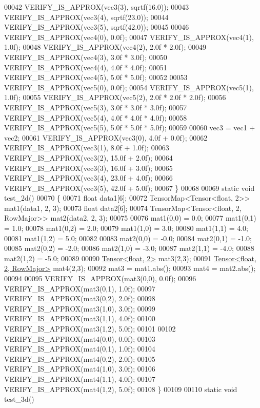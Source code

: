 \begin{DoxyCode}
00042   VERIFY\_IS\_APPROX(vec3(3), sqrtf(16.0));
00043   VERIFY\_IS\_APPROX(vec3(4), sqrtf(23.0));
00044   VERIFY\_IS\_APPROX(vec3(5), sqrtf(42.0));
00045 
00046   VERIFY\_IS\_APPROX(vec4(0), 0.0f);
00047   VERIFY\_IS\_APPROX(vec4(1), 1.0f);
00048   VERIFY\_IS\_APPROX(vec4(2), 2.0f * 2.0f);
00049   VERIFY\_IS\_APPROX(vec4(3), 3.0f * 3.0f);
00050   VERIFY\_IS\_APPROX(vec4(4), 4.0f * 4.0f);
00051   VERIFY\_IS\_APPROX(vec4(5), 5.0f * 5.0f);
00052 
00053   VERIFY\_IS\_APPROX(vec5(0), 0.0f);
00054   VERIFY\_IS\_APPROX(vec5(1), 1.0f);
00055   VERIFY\_IS\_APPROX(vec5(2), 2.0f * 2.0f * 2.0f);
00056   VERIFY\_IS\_APPROX(vec5(3), 3.0f * 3.0f * 3.0f);
00057   VERIFY\_IS\_APPROX(vec5(4), 4.0f * 4.0f * 4.0f);
00058   VERIFY\_IS\_APPROX(vec5(5), 5.0f * 5.0f * 5.0f);
00059 
00060   vec3 = vec1 + vec2;
00061   VERIFY\_IS\_APPROX(vec3(0), 4.0f + 0.0f);
00062   VERIFY\_IS\_APPROX(vec3(1), 8.0f + 1.0f);
00063   VERIFY\_IS\_APPROX(vec3(2), 15.0f + 2.0f);
00064   VERIFY\_IS\_APPROX(vec3(3), 16.0f + 3.0f);
00065   VERIFY\_IS\_APPROX(vec3(4), 23.0f + 4.0f);
00066   VERIFY\_IS\_APPROX(vec3(5), 42.0f + 5.0f);
00067 \}
00068 
00069 \textcolor{keyword}{static} \textcolor{keywordtype}{void} test\_2d()
00070 \{
00071   \textcolor{keywordtype}{float} data1[6];
00072   TensorMap<Tensor<float, 2>> mat1(data1, 2, 3);
00073   \textcolor{keywordtype}{float} data2[6];
00074   TensorMap<Tensor<float, 2, RowMajor>> mat2(data2, 2, 3);
00075 
00076   mat1(0,0) = 0.0;
00077   mat1(0,1) = 1.0;
00078   mat1(0,2) = 2.0;
00079   mat1(1,0) = 3.0;
00080   mat1(1,1) = 4.0;
00081   mat1(1,2) = 5.0;
00082 
00083   mat2(0,0) = -0.0;
00084   mat2(0,1) = -1.0;
00085   mat2(0,2) = -2.0;
00086   mat2(1,0) = -3.0;
00087   mat2(1,1) = -4.0;
00088   mat2(1,2) = -5.0;
00089 
00090   \hyperlink{class_eigen_1_1_tensor}{Tensor<float, 2>} mat3(2,3);
00091   \hyperlink{class_eigen_1_1_tensor}{Tensor<float, 2, RowMajor>} mat4(2,3);
00092   mat3 = mat1.abs();
00093   mat4 = mat2.abs();
00094 
00095   VERIFY\_IS\_APPROX(mat3(0,0), 0.0f);
00096   VERIFY\_IS\_APPROX(mat3(0,1), 1.0f);
00097   VERIFY\_IS\_APPROX(mat3(0,2), 2.0f);
00098   VERIFY\_IS\_APPROX(mat3(1,0), 3.0f);
00099   VERIFY\_IS\_APPROX(mat3(1,1), 4.0f);
00100   VERIFY\_IS\_APPROX(mat3(1,2), 5.0f);
00101 
00102   VERIFY\_IS\_APPROX(mat4(0,0), 0.0f);
00103   VERIFY\_IS\_APPROX(mat4(0,1), 1.0f);
00104   VERIFY\_IS\_APPROX(mat4(0,2), 2.0f);
00105   VERIFY\_IS\_APPROX(mat4(1,0), 3.0f);
00106   VERIFY\_IS\_APPROX(mat4(1,1), 4.0f);
00107   VERIFY\_IS\_APPROX(mat4(1,2), 5.0f);
00108 \}
00109 
00110 \textcolor{keyword}{static} \textcolor{keywordtype}{void} test\_3d()

\end{DoxyCode}
